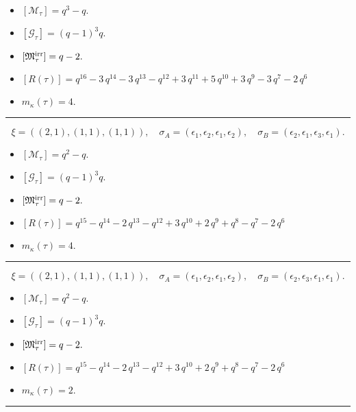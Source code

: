\documentclass[10pt,a4paper]{amsart}
\begin{document}
\begin{itemize}
 \item $[\mathcal{M}_{\tau}] = q^{3} - q .$

 \item $[\mathcal{G}_{\tau}] = {\left(q - 1\right)}^{3} q .$

 \item $[{\frak M}_{\tau}^{\textrm{irr}}] = q - 2 .$

 \item $[R(\tau)] = q^{16} - 3 \, q^{14} - 3 \, q^{13} - q^{12} + 3 \, q^{11} + 5 \, q^{10} + 3 \, q^{9} - 3 \, q^{7} - 2 \, q^{6} $

 \item $m_{\kappa}(\tau) = 4 .$

 \end{itemize}
\noindent\rule{8cm}{0.4pt}

$$\xi = ({(2, 1), (1, 1)}, {(1, 1)}),\quad \sigma_A = ({{\epsilon_1, \epsilon_2}, {\epsilon_1}}, {{\epsilon_2}}),\quad \sigma_B = ({{\epsilon_2, \epsilon_1}, {\epsilon_3}}, {{\epsilon_1}}).$$

\begin{itemize}
 \item $[\mathcal{M}_{\tau}] = q^{2} - q .$

 \item $[\mathcal{G}_{\tau}] = {\left(q - 1\right)}^{3} q .$

 \item $[{\frak M}_{\tau}^{\textrm{irr}}] = q - 2 .$

 \item $[R(\tau)] = q^{15} - q^{14} - 2 \, q^{13} - q^{12} + 3 \, q^{10} + 2 \, q^{9} + q^{8} - q^{7} - 2 \, q^{6} $

 \item $m_{\kappa}(\tau) = 4 .$

 \end{itemize}
\noindent\rule{8cm}{0.4pt}

$$\xi = ({(2, 1), (1, 1)}, {(1, 1)}),\quad \sigma_A = ({{\epsilon_1, \epsilon_2}, {\epsilon_1}}, {{\epsilon_2}}),\quad \sigma_B = ({{\epsilon_2, \epsilon_3}, {\epsilon_1}}, {{\epsilon_1}}).$$

\begin{itemize}
 \item $[\mathcal{M}_{\tau}] = q^{2} - q .$

 \item $[\mathcal{G}_{\tau}] = {\left(q - 1\right)}^{3} q .$

 \item $[{\frak M}_{\tau}^{\textrm{irr}}] = q - 2 .$

 \item $[R(\tau)] = q^{15} - q^{14} - 2 \, q^{13} - q^{12} + 3 \, q^{10} + 2 \, q^{9} + q^{8} - q^{7} - 2 \, q^{6} $

 \item $m_{\kappa}(\tau) = 2 .$

 \end{itemize}
\noindent\rule{8cm}{0.4pt}
\end{document}
